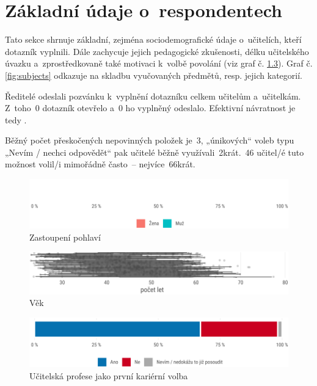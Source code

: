 \documentclass[12pt,a4paper,]{report}
\begin{document}
\hypertarget{zuxe1kladnuxed-uxfadaje-o-respondentech}{%
\chapter{\texorpdfstring{Základní údaje o~respondentech}{Základní údaje orespondentech}}\label{zuxe1kladnuxed-uxfadaje-o-respondentech}}

Tato sekce shrnuje základní, zejména sociodemografické údaje o~učitelích, kteří dotazník vyplnili. Dále zachycuje jejich pedagogické zkušenosti, délku učitelského úvazku a~zprostředkovaně také motivaci k~volbě povolání (viz graf č. \ref{fig:career}). Graf č. \ref{fig:subjects} odkazuje na skladbu vyučovaných předmětů, resp. jejich kategorií.

Ředitelé odeslali pozvánku k~vyplnění dotazníku celkem učitelům a~učitelkám.
Z~toho~0 dotazník otevřelo a~0 ho vyplněný odeslalo. Efektivní návratnost je tedy .

Běžný počet přeskočených nepovinných položek je~3, „únikových`` voleb typu „Nevím / nechci odpovědět`` pak učitelé běžně využívali~2krát.~46 učitel/é tuto možnost volil/i mimořádně často~-- nejvíce~66krát.

\begin{figure}

{\centering \includegraphics[width=\textwidth]{figs/sex-1} 

}

\caption{Zastoupení pohlaví}\label{fig:sex}
\end{figure}

\begin{figure}

{\centering \includegraphics[width=\textwidth]{figs/age-1} 

}

\caption{Věk}\label{fig:age}
\end{figure}

\begin{figure}

{\centering \includegraphics[width=\textwidth]{figs/career-1} 

}

\caption{Učitelská profese jako první kariérní volba}\label{fig:career}
\end{figure}
\end{document}
